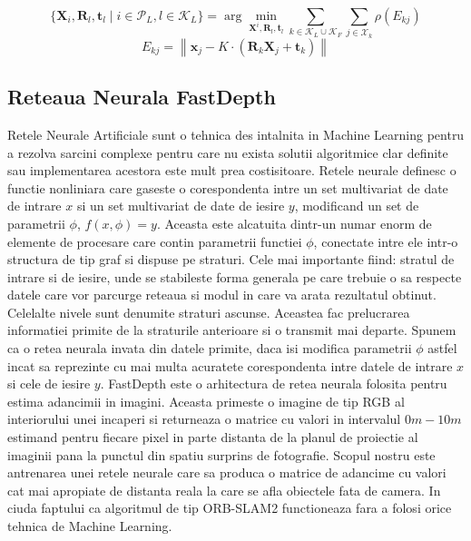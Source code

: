 \documentclass[12pt,a4paper]{report}
\begin{document}
\begin{equation}
\{\mathbf{X}_i, \mathbf{R}_l, \mathbf{t}_l \mid i \in \mathcal{P}_L, l \in \mathcal{K}_L\} = \arg \min_{\mathbf{X}^i, \mathbf{R}_l, \mathbf{t}_l} \sum_{k \in \mathcal{K}_L \cup \mathcal{K}_F} \sum_{j \in \mathcal{X}_k} \rho(E_{kj})
\end{equation}
\begin{equation}  
E_{kj} = \left\| \mathbf{x}_{j} - K \cdot \left(\mathbf{R}_k \mathbf{X}_j + \mathbf{t}_k\right) \right\|
\end{equation}

\subsection{Reteaua Neurala FastDepth}
Retele Neurale Artificiale sunt o tehnica des intalnita in Machine Learning pentru a rezolva 
sarcini complexe pentru care nu exista solutii algoritmice clar definite sau implementarea acestora 
este mult prea costisitoare. Retele neurale definesc o functie nonliniara care gaseste o 
corespondenta intre un set multivariat de date de intrare \(x\) si un set multivariat de 
date de iesire \(y\), modificand un set de parametrii $ \phi $, $ f(x, \phi) = y $. Aceasta este
alcatuita dintr-un numar enorm de elemente de procesare care contin parametrii functiei $ \phi $,
conectate intre ele intr-o structura de tip graf si dispuse pe straturi. Cele mai importante fiind: stratul de intrare
si de iesire, unde se stabileste forma generala pe care trebuie o sa respecte datele care vor
parcurge reteaua si modul in care va arata rezultatul obtinut. Celelalte nivele sunt denumite 
straturi ascunse. Aceastea fac prelucrarea informatiei primite de la straturile anterioare 
si o transmit mai departe. Spunem ca o retea neurala invata din datele primite, daca isi 
modifica parametrii $ \phi $ astfel incat sa reprezinte cu mai multa acuratete corespondenta
intre datele de intrare \(x\) si cele de iesire \(y\).
FastDepth este o arhitectura de retea neurala folosita pentru estima adancimii in imagini. 
Aceasta primeste o imagine de tip RGB al interiorului unei incaperi si returneaza o matrice
cu valori in intervalul $0m - 10m$ estimand pentru fiecare pixel in parte distanta de la
planul de proiectie al imaginii pana la punctul din spatiu surprins de fotografie. Scopul nostru
este antrenarea unei retele neurale care sa produca o matrice de adancime cu valori cat mai 
apropiate de distanta reala la care se afla obiectele fata de camera. In ciuda 
faptului ca algoritmul de tip ORB-SLAM2 functioneaza fara a folosi orice tehnica de Machine Learning. 
\end{document}

